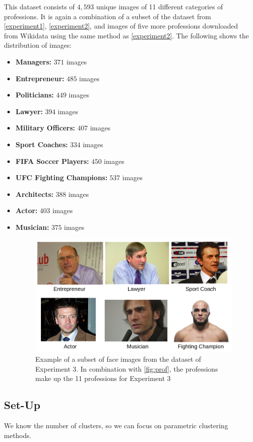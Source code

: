 \documentclass[12pt,english]{article}
\begin{document}
\quad
This dataset consists of $4,593$ unique images of 11 different categories of professions. It is again a combination of a subset of the dataset from \ref{experiment1}, \ref{experiment2}, and images of five more professions downloaded from Wikidata using the same method as \ref{experiment2}. The following shows the distribution of images:

\begin{itemize}
\item \textbf{Managers: } $371$ images
\item \textbf{Entrepreneur: } $485$ images
\item \textbf{Politicians: } $449$ images
\item \textbf{Lawyer: } $394$ images
\item \textbf{Military Officers: } $407$ images
\item \textbf{Sport Coaches: } $334$ images
\item \textbf{FIFA Soccer Players: } $450$ images
\item \textbf{UFC Fighting Champions: } $537$ images
\item \textbf{Architects: } $388$ images
\item \textbf{Actor: } $403$ images
\item \textbf{Musician: } $375$ images

\begin{figure}[!tbp]
 \centering
    \includegraphics[width=0.7\columnwidth]{figures/ex3.png}
    \caption{Example of a subset of face images from the dataset of Experiment 3. In combination with \ref{fig:prof}, the professions make up the 11 professions for Experiment 3}
\end{figure}

\end{itemize}


\subsection{Set-Up}
We know the number of clusters, so we can focus on parametric clustering methods.
\end{document}
